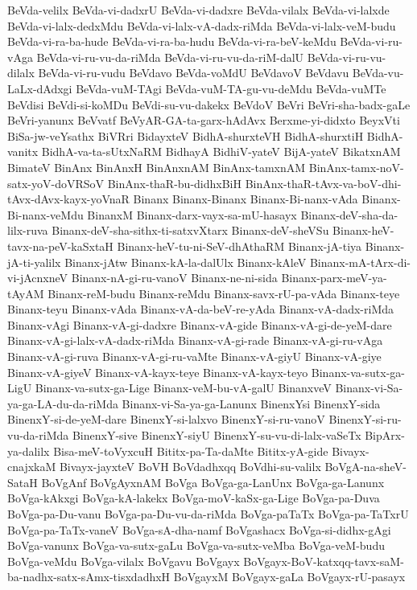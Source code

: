 {BeVda-velilx
BeVda-vi-dadxrU
BeVda-vi-dadxre
BeVda-vilalx
BeVda-vi-lalxde
BeVda-vi-lalx-dedxMdu
BeVda-vi-lalx-vA-dadx-riMda
BeVda-vi-lalx-veM-budu
BeVda-vi-ra-ba-hude
BeVda-vi-ra-ba-hudu
BeVda-vi-ra-beV-keMdu
BeVda-vi-ru-vAga
BeVda-vi-ru-vu-da-riMda
BeVda-vi-ru-vu-da-riM-dalU
BeVda-vi-ru-vu-dilalx
BeVda-vi-ru-vudu
BeVdavo
BeVda-voMdU
BeVdavoV
BeVdavu
BeVda-vu-LaLx-dAdxgi
BeVda-vuM-TAgi
BeVda-vuM-TA-gu-vu-deMdu
BeVda-vuMTe
BeVdisi
BeVdi-si-koMDu
BeVdi-su-vu-dakekx
BeVdoV
BeVri
BeVri-sha-badx-gaLe
BeVri-yanunx
BeVvatf
BeVyAR-GA-ta-garx-hAdAvx
Berxme-yi-didxto
BeyxVti
BiSa-jw-veYsathx
BiVRri
BidayxteV
BidhA-shurxteVH
BidhA-shurxtiH
BidhA-vanitx
BidhA-va-ta-sUtxNaRM
BidhayA
BidhiV-yateV
BijA-yateV
BikatxnAM
BimateV
BinAnx
BinAnxH
BinAnxnAM
BinAnx-tamxnAM
BinAnx-tamx-noV-satx-yoV-doVRSoV
BinAnx-thaR-bu-didhxBiH
BinAnx-thaR-tAvx-va-boV-dhi-tAvx-dAvx-kayx-yoVnaR
Binanx
Binanx-Binanx
Binanx-Bi-nanx-vAda
Binanx-Bi-nanx-veMdu
BinanxM
Binanx-darx-vayx-sa-mU-hasayx
Binanx-deV-sha-da-lilx-ruva
Binanx-deV-sha-sithx-ti-satxvXtarx
Binanx-deV-sheVSu
Binanx-heV-tavx-na-peV-kaSxtaH
Binanx-heV-tu-ni-SeV-dhAthaRM
Binanx-jA-tiya
Binanx-jA-ti-yalilx
Binanx-jAtw
Binanx-kA-la-dalUlx
Binanx-kAleV
Binanx-mA-tArx-di-vi-jAcnxneV
Binanx-nA-gi-ru-vanoV
Binanx-ne-ni-sida
Binanx-parx-meV-ya-tAyAM
Binanx-reM-budu
Binanx-reMdu
Binanx-savx-rU-pa-vAda
Binanx-teye
Binanx-teyu
Binanx-vAda
Binanx-vA-da-beV-re-yAda
Binanx-vA-dadx-riMda
Binanx-vAgi
Binanx-vA-gi-dadxre
Binanx-vA-gide
Binanx-vA-gi-de-yeM-dare
Binanx-vA-gi-lalx-vA-dadx-riMda
Binanx-vA-gi-rade
Binanx-vA-gi-ru-vAga
Binanx-vA-gi-ruva
Binanx-vA-gi-ru-vaMte
Binanx-vA-giyU
Binanx-vA-giye
Binanx-vA-giyeV
Binanx-vA-kayx-teye
Binanx-vA-kayx-teyo
Binanx-va-sutx-ga-LigU
Binanx-va-sutx-ga-Lige
Binanx-veM-bu-vA-galU
BinanxveV
Binanx-vi-Sa-ya-ga-LA-du-da-riMda
Binanx-vi-Sa-ya-ga-Lanunx
BinenxYsi
BinenxY-sida
BinenxY-si-de-yeM-dare
BinenxY-si-lalxvo
BinenxY-si-ru-vanoV
BinenxY-si-ru-vu-da-riMda
BinenxY-sive
BinenxY-siyU
BinenxY-su-vu-di-lalx-vaSeTx
BipArx-ya-dalilx
Bisa-meV-toVyxcuH
Bititx-pa-Ta-daMte
Bititx-yA-gide
Bivayx-cnajxkaM
Bivayx-jayxteV
BoVH
BoVdadhxqq
BoVdhi-su-valilx
BoVgA-na-sheV-SataH
BoVgAnf
BoVgAyxnAM
BoVga
BoVga-ga-LanUnx
BoVga-ga-Lanunx
BoVga-kAkxgi
BoVga-kA-lakekx
BoVga-moV-kaSx-ga-Lige
BoVga-pa-Duva
BoVga-pa-Du-vanu
BoVga-pa-Du-vu-da-riMda
BoVga-paTaTx
BoVga-pa-TaTxrU
BoVga-pa-TaTx-vaneV
BoVga-sA-dha-namf
BoVgashacx
BoVga-si-didhx-gAgi
BoVga-vanunx
BoVga-va-sutx-gaLu
BoVga-va-sutx-veMba
BoVga-veM-budu
BoVga-veMdu
BoVga-vilalx
BoVgavu
BoVgayx
BoVgayx-BoV-katxqq-tavx-saM-ba-nadhx-satx-sAmx-tisxdadhxH
BoVgayxM
BoVgayx-gaLa
BoVgayx-rU-pasayx
}
